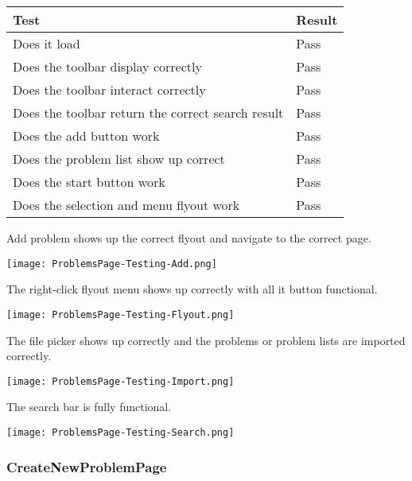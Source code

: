 \documentclass[report.tex]{subfiles}
\begin{document}
\begin{tabulary}{\linewidth}{|L|l|}
    \hline
    Test & Result \\
    \hline
    Does it load & Pass \\
    \hline
    Does the toolbar display correctly & Pass \\
    \hline
    Does the toolbar interact correctly & Pass \\
    \hline
    Does the toolbar return the correct search result & Pass \\
    \hline
    Does the add button work & Pass \\
    \hline
    Does the problem list show up correct & Pass \\
    \hline
    Does the start button work & Pass \\
    \hline
    Does the selection and menu flyout work & Pass \\
    \hline
\end{tabulary}

Add problem shows up the correct flyout and navigate to the correct page.

\texttt{[image: ProblemsPage-Testing-Add.png]}

The right-click flyout menu shows up correctly with all it button functional.

\texttt{[image: ProblemsPage-Testing-Flyout.png]}

The file picker shows up correctly and the problems or problem lists are imported correctly.

\texttt{[image: ProblemsPage-Testing-Import.png]}

The search bar is fully functional.

\texttt{[image: ProblemsPage-Testing-Search.png]}

\subsubsection{CreateNewProblemPage}
\end{document}
